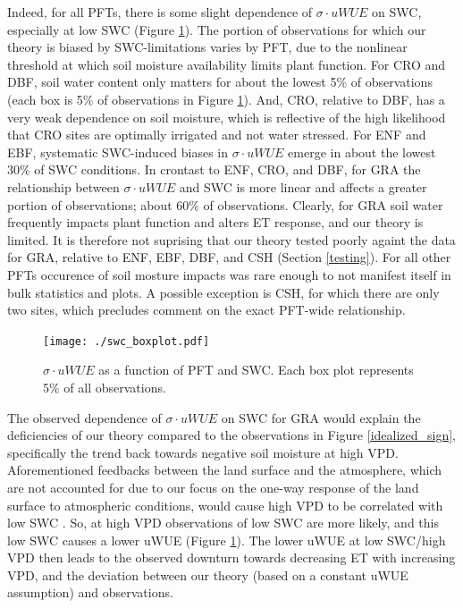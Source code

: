 \documentclass[draft,linenumbers]{agujournal}
\begin{document}
Indeed, for all PFTs, there is some slight dependence of $\sigma \cdot
uWUE$ on SWC, especially at low SWC (Figure \ref{swc_boxplot}). The
portion of observations for which our theory is biased by
SWC-limitations varies by PFT, due to the nonlinear threshold at which
soil moisture availability limits plant function. For CRO and DBF,
soil water content only matters for about the lowest 5\% of
observations (each box is 5\% of observations in Figure
\ref{swc_boxplot}). And, CRO, relative to DBF, has a very weak
dependence on soil moisture, which is reflective of the high
likelihood that CRO sites are optimally irrigated and not water
stressed. For ENF and EBF, systematic SWC-induced biases in $\sigma
\cdot uWUE$ emerge in about the lowest 30\% of SWC conditions. In
crontast to ENF, CRO, and DBF, for GRA the relationship between
$\sigma \cdot uWUE$ and SWC is more linear and affects a greater
portion of observations; about 60\% of observations. Clearly, for GRA
soil water frequently impacts plant function and alters ET response,
and our theory is limited. It is therefore not suprising that our
theory tested poorly againt the data for GRA, relative to ENF, EBF,
DBF, and CSH (Section \ref{testing}). For all other PFTs occurence of
soil mosture impacts was rare enough to not manifest itself in bulk
statistics and plots. A possible exception is CSH, for which there are
only two sites, which precludes comment on the exact PFT-wide
relationship.

\begin{figure} \centering
\texttt{[image: ./swc\_boxplot.pdf]}
\caption{$\sigma \cdot uWUE$ as a function of PFT and SWC. Each box
plot represents 5\% of all observations.}
\label{swc_boxplot}
\end{figure}

The observed dependence of $\sigma \cdot uWUE$ on SWC for GRA would
explain the deficiencies of our theory compared to the observations in
Figure \ref{idealized_sign}, specifically the trend back towards
negative soil moisture at high VPD. Aforementioned feedbacks between
the land surface and the atmosphere, which are not accounted for due
to our focus on the one-way response of the land surface to
atmospheric conditions, would cause high VPD to be correlated with low
SWC \citep[][]{Gentine_2016, Berg_2016}. So, at high VPD observations
of low SWC are more likely, and this low SWC causes a lower uWUE
(Figure \ref{swc_boxplot}). The lower uWUE at low SWC/high VPD then
leads to the observed downturn towards decreasing ET with increasing
VPD, and the deviation between our theory (based on a constant uWUE
assumption) and observations.
\end{document}
